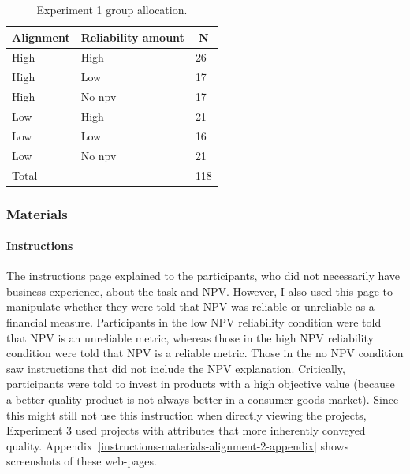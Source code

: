 \documentclass[a4paper, nobind, dvipsnames]{templates/ociamthesis}
\theoremstyle{definition}
\theoremstyle{definition}
\theoremstyle{definition}
\theoremstyle{definition}
\theoremstyle{remark}
\begin{document}
\begin{table}[tbp]

\begin{center}
\begin{threeparttable}

\caption{\label{tab:condition-allocation-alignment-2}Experiment 1 group allocation.}

\begin{tabular}{lll}
\toprule
Alignment & \multicolumn{1}{c}{Reliability amount} & \multicolumn{1}{c}{N}\\
\midrule
High & High & 26\\
High & Low & 17\\
High & No npv & 17\\
Low & High & 21\\
Low & Low & 16\\
Low & No npv & 21\\
Total & - & 118\\
\bottomrule
\end{tabular}

\end{threeparttable}
\end{center}

\end{table}

\hypertarget{materials-alignment-2}{%
\subsubsection{Materials}\label{materials-alignment-2}}

\hypertarget{instructions-materials-alignment-2}{%
\paragraph{Instructions}\label{instructions-materials-alignment-2}}

The instructions page explained to the participants, who did not necessarily
have business experience, about the task and NPV. However, I also used this page
to manipulate whether they were told that NPV was reliable or unreliable as a
financial measure. Participants in the low NPV reliability condition were told
that NPV is an unreliable metric, whereas those in the high NPV reliability
condition were told that NPV is a reliable metric. Those in the no NPV condition
saw instructions that did not include the NPV explanation. Critically,
participants were told to invest in products with a high objective value
(because a better quality product is not always better in a consumer goods
market). Since this might still not use this instruction when directly viewing
the projects, Experiment 3 used projects with attributes that more inherently
conveyed quality. Appendix~\ref{instructions-materials-alignment-2-appendix}
shows screenshots of these web-pages.
\end{document}
